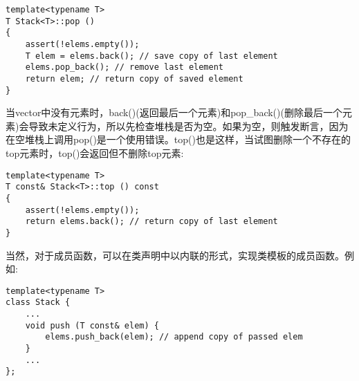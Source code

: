 \begin{lstlisting}[style=styleCXX]
template<typename T>
T Stack<T>::pop ()
{
	assert(!elems.empty());
	T elem = elems.back(); // save copy of last element
	elems.pop_back(); // remove last element
	return elem; // return copy of saved element
}
\end{lstlisting}

当vector中没有元素时，back()(返回最后一个元素)和pop\_back()(删除最后一个元素)会导致未定义行为，所以先检查堆栈是否为空。如果为空，则触发断言，因为在空堆栈上调用pop()是一个使用错误。top()也是这样，当试图删除一个不存在的top元素时，top()会返回但不删除top元素:

\begin{lstlisting}[style=styleCXX]
template<typename T>
T const& Stack<T>::top () const
{
	assert(!elems.empty());
	return elems.back(); // return copy of last element
}
\end{lstlisting}

当然，对于成员函数，可以在类声明中以内联的形式，实现类模板的成员函数。例如:

\begin{lstlisting}[style=styleCXX]
template<typename T>
class Stack {
	...
	void push (T const& elem) {
		elems.push_back(elem); // append copy of passed elem
	}
	...
};
\end{lstlisting}






